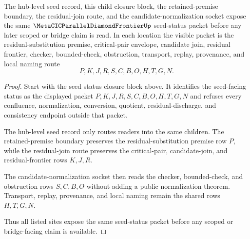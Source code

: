 \begin{theorem}
\label{thm:metacic-parallel-diamond-frontier-seed-status-sync}
The hub-level seed record, this child closure block, the retained-premise boundary, the residual-join route, and the candidate-normalization socket expose the same $\MetaCICParallelDiamondFrontierUp$ seed-status packet before any later scoped or bridge claim is read. In each location the visible packet is the residual-substitution premise, critical-pair envelope, candidate join, residual frontier, checker, bounded-check, obstruction, transport, replay, provenance, and local naming route
$$
P,K,J,R,S,C,B,O,H,T,G,N .
$$
\end{theorem}
\begin{proof}
Start with the seed status closure block above. It identifies the seed-facing status as the displayed packet $P,K,J,R,S,C,B,O,H,T,G,N$ and refuses every confluence, normalization, conversion, quotient, residual-discharge, and consistency endpoint outside that packet.

The hub-level seed record only routes readers into the same children. The retained-premise boundary preserves the residual-substitution premise row $P$, while the residual-join route preserves the critical-pair, candidate-join, and residual-frontier rows $K,J,R$.

The candidate-normalization socket then reads the checker, bounded-check, and obstruction rows $S,C,B,O$ without adding a public normalization theorem. Transport, replay, provenance, and local naming remain the shared rows $H,T,G,N$.

Thus all listed sites expose the same seed-status packet before any scoped or bridge-facing claim is available.
\end{proof}
